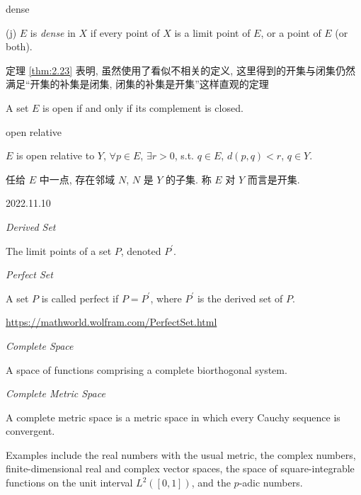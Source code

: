 \begin{myDef} dense

    (j) $E$ is \emph{dense} in $X$ if every point of $X$ is a limit point of $E$, or a point of $E$ (or both).
\end{myDef}

定理 \ref{thm:2.23} 表明, 虽然使用了看似不相关的定义, 这里得到的开集与闭集仍然满足``开集的补集是闭集, 闭集的补集是开集''这样直观的定理
\begin{mynewthm}
    A set $E$ is open if and only if its complement is closed.
\end{mynewthm}

\begin{myDef} open relative

    $E$ is open relative to $Y$, $\forall p \in E$, $\exists r>0$, s.t. $q \in E$, $d(p, q)<r$, $q \in Y$.
\end{myDef}
任给 $E$ 中一点, 存在邻域 $N$, $N$ 是 $Y$ 的子集. 称 $E$ 对 $Y$ 而言是开集.


2022.11.10

\begin{myDef}
    \emph{Derived Set}

    The limit points of a set ${P}$, denoted $P^{'}$. 
\end{myDef}

\begin{myDef}
    \emph{Perfect Set}

    A set $P$ is called perfect if $P=P^{'}$, where $P^{'}$ is the derived set of $P$.
\end{myDef}
\url{https://mathworld.wolfram.com/PerfectSet.html}

\begin{myDef}
    \emph{Complete Space}

    A space of functions comprising a complete biorthogonal system.
\end{myDef}

\begin{myDef}
    \emph{Complete Metric Space}

    A complete metric space is a metric space in which every Cauchy sequence is convergent.

    Examples include the real numbers with the usual metric, the complex numbers, finite-dimensional real and complex vector spaces, the space of square-integrable functions on the unit interval $L^2([0,1])$, and the $p$-adic numbers.
\end{myDef}